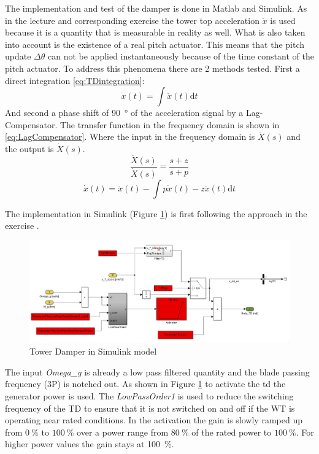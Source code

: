 The implementation and test of the damper is done in Matlab and Simulink.
As in the lecture \cite{SchlipfLecture} and corresponding exercise the tower top acceleration $\ddot{x}$ is used because it is a quantity that is measurable in reality as well.
What is also taken into account is the existence of a real pitch actuator. This means that the pitch update $\Delta\theta$ can not be applied instantaneously because of the time constant of the pitch actuator.
To address this phenomena there are 2 methods tested. 
First a direct integration \ref{eq:TDintegration}: 
\begin{equation}
	\dot{x}(t) = \int\ddot{x}(t) \text{d}t
	\label{eq:TDintegration}
\end{equation} 
And second a phase shift of \SI{90}{\degree} of the acceleration signal by a Lag-Compensator. The transfer function in the frequency domain is shown in \ref{eq:LagCompensator}. Where the input in the frequency domain is $\ddot{X}(s)$ and the output is $\dot{X}(s)$. 
\begin{equation}
	\frac{\ddot{X}(s)}{\dot{X}(s)} = \frac{s + z}{s + p}
	\label{eq:LagCompensator}
\end{equation} 
\begin{equation}
	\dot{x}(t) = \ddot{x}(t) - \int p\dot{x}(t) - z\ddot{x}(t) \text{d}t
	\label{eq:xddTimeDomain}
\end{equation} 


The implementation in Simulink (Figure \ref{fig:TDoverview}) is first following the approach in the exercise \cite{SchlipfLecture}.

\begin{figure}[tbh]
	\centering	
	\includegraphics[width=12cm]{Figures/TDoverview}
	\caption{Tower Damper in Simulink model}
	\label{fig:TDoverview}
\end{figure} 

The input \textit{Omega\_g} is already a low pass filtered quantity and the blade passing frequency (3P) is notched out. As shown in Figure \ref{fig:TDoverview} to activate the \gls{td} the generator power is used. The \textit{LowPassOrder1} is used to reduce the switching frequency of the TD to ensure that it is not switched on and off if the \gls{WT} is operating near rated conditions. In the activation the gain is slowly ramped up from $\SI{0}{\%}$ to $\SI{100}{\%}$ over a power range from $\SI{80}{\%}$ of the rated power to $\SI{100}{\%}$.
For higher power values the gain stays at \SI{100}{\%}.

